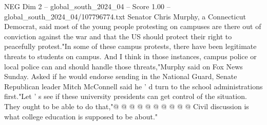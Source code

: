 \begin{textsample}{NEG Dim 2 – global\_south\_2024\_04 – Score 1.00 – global\_south\_2024\_04/107796774.txt}
Senator Chris Murphy, a Connecticut Democrat, said most of the young people protesting on campuses are there out of conviction against the war and that the US should protect their right to peacefully protest."In some of these campus protests, there have been legitimate threats to students on campus.
And I think in those instances, campus police or local police can and should handle those threats,"Murphy said on Fox News Sunday.
Asked if he would endorse sending in the National Guard, Senate Republican leader Mitch McConnell said he ' d turn to the school administrations first."Let ' s see if these university presidents can get control of the situation.
They ought to be able to do that,"@ @ @ @ @ @ @ @ @ @ Civil discussion is what college education is supposed to be about."

\end{textsample}
